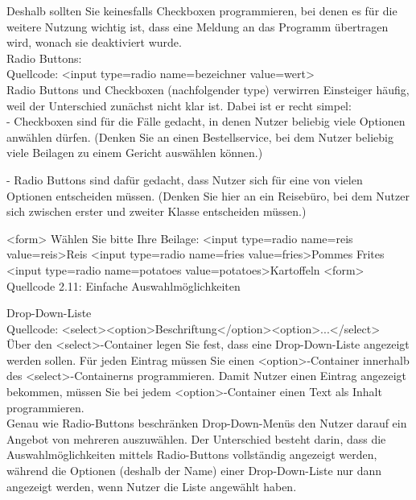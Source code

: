 Deshalb sollten Sie keinesfalls Checkboxen programmieren, bei denen es für die weitere Nutzung wichtig ist, dass eine Meldung an das Programm übertragen wird, wonach sie deaktiviert wurde.\\

Radio Buttons:\\

Quellcode: <input type=radio name=bezeichner value=wert>\\

Radio Buttons und Checkboxen (nachfolgender type) verwirren Einsteiger häufig, weil der Unterschied zunächst nicht klar ist. Dabei ist er recht simpel: \\

-	Checkboxen sind für die Fälle gedacht, in denen Nutzer beliebig viele Optionen anwählen dürfen. (Denken Sie an einen Bestellservice, bei dem Nutzer beliebig viele Beilagen zu einem Gericht auswählen können.)

-	Radio Buttons sind dafür gedacht, dass Nutzer sich für eine von vielen Optionen entscheiden müssen. (Denken Sie hier an ein Reisebüro, bei dem Nutzer sich zwischen erster und zweiter Klasse entscheiden müssen.)

<form>
Wählen Sie bitte Ihre Beilage:
<input type=radio name=reis value=reis>Reis
<input type=radio name=fries value=fries>Pommes Frites
<input type=radio name=potatoes value=potatoes>Kartoffeln
<form>
Quellcode 2.11: Einfache Auswahlmöglichkeiten

Drop-Down-Liste\\

Quellcode: <select><option>Beschriftung</option><option>...</select>\\

Über den <select>-Container legen Sie fest, dass eine Drop-Down-Liste angezeigt werden sollen. Für jeden Eintrag müssen Sie einen <option>-Container innerhalb des <select>-Containerns programmieren. Damit Nutzer einen Eintrag angezeigt bekommen, müssen Sie bei jedem <option>-Container einen Text als Inhalt programmieren.\\

Genau wie Radio-Buttons beschränken Drop-Down-Menüs den Nutzer darauf ein Angebot von mehreren auszuwählen. Der Unterschied besteht darin, dass die Auswahlmöglichkeiten mittels Radio-Buttons vollständig angezeigt werden, während die Optionen (deshalb der Name) einer Drop-Down-Liste nur dann angezeigt werden, wenn Nutzer die Liste angewählt haben.\\

